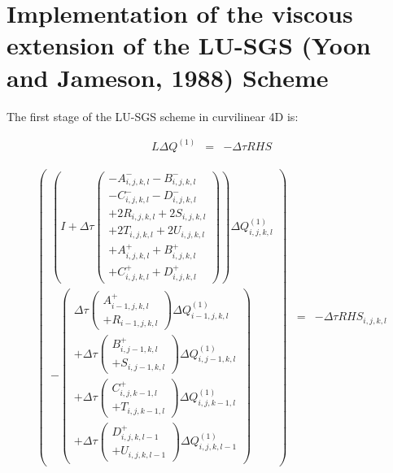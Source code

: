 \section{Implementation of the viscous extension of the LU-SGS (Yoon and Jameson, 1988) Scheme}

The first stage of the LU-SGS scheme in curvilinear 4D is:

\begin{eqnarray}
L \Delta Q^{\left(1 \right)} &=& -\Delta \tau RHS
\nonumber
\end{eqnarray}

\begin{eqnarray}
\left(
\begin{array}{c}
\left(
I
+ 
\Delta \tau
\left(
\begin{array}{c}
- A_{i,j,k,l}^- 
- B_{i,j,k,l}^- 
\\
- C_{i,j,k,l}^- 
- D_{i,j,k,l}^- 
\\
+ 2 R_{i,j,k,l} 
+ 2 S_{i,j,k,l} 
\\
+ 2 T_{i,j,k,l} 
+ 2 U_{i,j,k,l} 
\\
+ A^+_{i,j,k,l}
+ B^+_{i,j,k,l}
\\
+ C^+_{i,j,k,l}
+ D^+_{i,j,k,l}
\end{array}
\right)
\right) 
\Delta Q^{\left(1 \right)}_{i,j,k,l}
\\
-
\left(
\begin{array}{r}
\Delta \tau
  \left(
\begin{array}{r}
A^+_{i-1,j,k,l} 
\\
+ R_{i-1,j,k,l} 
\end{array}
\right) \Delta Q^{\left(1 \right)}_{i-1,j,k,l}
\\
+ 
\Delta \tau
\left(
\begin{array}{r}
B^+_{i,j-1,k,l} 
\\
+ S_{i,j-1,k,l} 
\end{array}
\right) \Delta Q^{\left(1 \right)}_{i,j-1,k,l}
\\
+ 
\Delta \tau
\left(
\begin{array}{r}
C^+_{i,j,k-1,l} 
\\
+ T_{i,j,k-1,l} 
\end{array}
\right) \Delta Q^{\left(1 \right)}_{i,j,k-1,l}
\\
+ 
\Delta \tau
\left(
\begin{array}{r}
D^+_{i,j,k,l-1} 
\\
+ U_{i,j,k,l-1} 
\end{array}
\right) \Delta Q^{\left(1 \right)}_{i,j,k,l-1}
\end{array}
\right)
\end{array}
\right)
&=&
-
\Delta \tau
RHS_{i,j,k,l}
\nonumber
\end{eqnarray}

